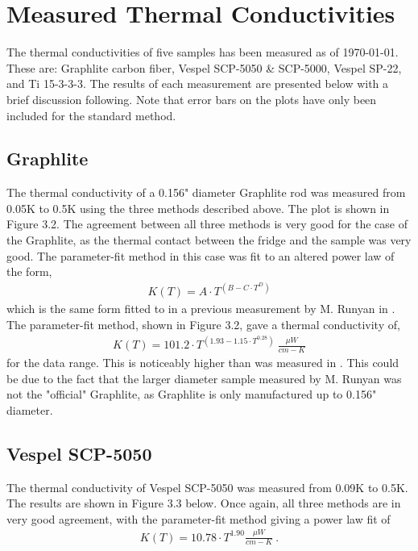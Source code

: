 \documentclass{report}
\begin{document}
\section{Measured Thermal Conductivities}
The thermal conductivities of five samples has been measured as of \today. These are: Graphlite carbon fiber, Vespel SCP-5050 \& SCP-5000, Vespel SP-22, and Ti 15-3-3-3. The results of each measurement are presented below with a brief discussion following. Note that error bars on the plots have only been included for the standard method.

\subsection{Graphlite}

The thermal conductivity of a 0.156" diameter Graphlite rod was measured from 0.05K to 0.5K using the three methods described above. The plot is shown in Figure 3.2. The agreement between all three methods is very good for the case of the Graphlite, as the thermal contact between the fridge and the sample was very good. The parameter-fit method in this case was fit to an altered power law of the form,
\begin{eqnarray}
K(T) = A \cdot T^{(B - C \cdot T^{D})}
\end{eqnarray}
which is the same form fitted to in a previous measurement by M. Runyan in \cite{run}. The parameter-fit method, shown in Figure 3.2, gave a thermal conductivity of,
\begin{eqnarray}
K(T) = 101.2 \cdot T^{(1.93 - 1.15 \cdot T^{0.28})} \ \frac{\mu W}{cm-K}
\end{eqnarray}
for the data range. This is noticeably higher than was measured in \cite{run}. This could be due to the fact that the larger diameter sample measured by M. Runyan was not the "official" Graphlite, as Graphlite is only manufactured up to 0.156" diameter.

\subsection{Vespel SCP-5050}

The thermal conductivity of Vespel SCP-5050 was measured from 0.09K to 0.5K. The results are shown in Figure 3.3 below. Once again, all three methods are in very good agreement, with the parameter-fit method giving a power law fit of
\begin{eqnarray}
K(T) = 10.78 \cdot T^{1.90} \frac{\mu W}{cm-K} \ .
\end{eqnarray}
\end{document}
